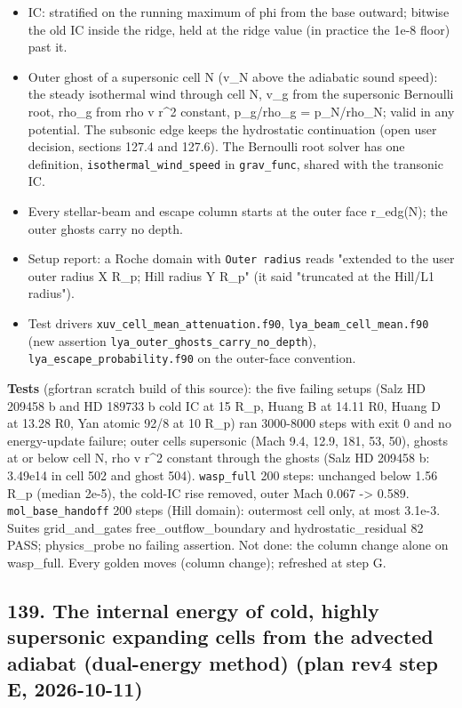 \documentclass[english,a4paper]{my_memo}
\providecommand{\tightlist}{\setlength{\itemsep}{0pt}\setlength{\parskip}{0pt}}
\begin{document}
\begin{itemize}
\tightlist
\item
  IC: stratified on the running maximum of phi from the base outward; bitwise the old IC inside the ridge, held at the ridge value (in practice the 1e-8 floor) past it.
\item
  Outer ghost of a supersonic cell N (v\_N above the adiabatic sound speed): the steady isothermal wind through cell N, v\_g from the supersonic Bernoulli root, rho\_g from rho v r\^{}2 constant, p\_g/rho\_g = p\_N/rho\_N; valid in any potential. The subsonic edge keeps the hydrostatic continuation (open user decision, sections 127.4 and 127.6). The Bernoulli root solver has one definition, \texttt{isothermal\_wind\_speed} in \texttt{grav\_func}, shared with the transonic IC.
\item
  Every stellar-beam and escape column starts at the outer face r\_edg(N); the outer ghosts carry no depth.
\item
  Setup report: a Roche domain with \texttt{Outer\ radius} reads "extended to the user outer radius X R\_p; Hill radius Y R\_p" (it said "truncated at the Hill/L1 radius").
\item
  Test drivers \texttt{xuv\_cell\_mean\_attenuation.f90}, \texttt{lya\_beam\_cell\_mean.f90} (new assertion \texttt{lya\_outer\_ghosts\_carry\_no\_depth}), \texttt{lya\_escape\_probability.f90} on the outer-face convention.
\end{itemize}

\textbf{Tests} (gfortran scratch build of this source): the five failing setups (Salz HD 209458 b and HD 189733 b cold IC at 15 R\_p, Huang B at 14.11 R0, Huang D at 13.28 R0, Yan atomic 92/8 at 10 R\_p) ran 3000-8000 steps with exit 0 and no energy-update failure; outer cells supersonic (Mach 9.4, 12.9, 181, 53, 50), ghosts at or below cell N, rho v r\^{}2 constant through the ghosts (Salz HD 209458 b: 3.49e14 in cell 502 and ghost 504). \texttt{wasp\_full} 200 steps: unchanged below 1.56 R\_p (median 2e-5), the cold-IC rise removed, outer Mach 0.067 -\textgreater{} 0.589. \texttt{mol\_base\_handoff} 200 steps (Hill domain): outermost cell only, at most 3.1e-3. Suites grid\_and\_gates free\_outflow\_boundary and hydrostatic\_residual 82 PASS; physics\_probe no failing assertion. Not done: the column change alone on wasp\_full. Every golden moves (column change); refreshed at step G.

\subsection{139. The internal energy of cold, highly supersonic expanding cells from the advected adiabat (dual-energy method) (plan rev4 step E, 2026-10-11)}\label{139-the-internal-energy-of-cold-highly-supersonic-expanding-cells-from-the-advected-adiabat-dual-energy-method-plan-rev4-step-e-2026-10-11}
\end{document}
